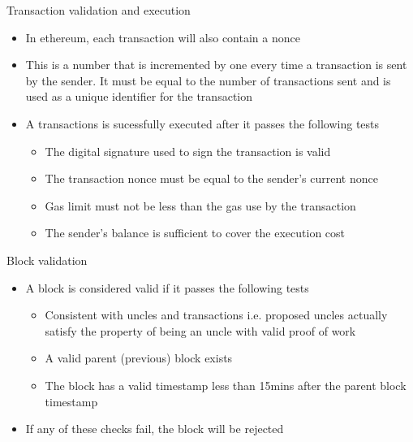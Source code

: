 \documentclass[10pt]{beamer}
\begin{document}

\begin{frame}{Transaction validation and execution}
	\begin{itemize}
		\item In ethereum, each transaction will also contain a nonce
		\item This is a number that is incremented by one every time a transaction is sent by the sender. It must be equal to the number of transactions sent and is used as a unique identifier for the transaction
		\item A transactions is sucessfully executed after it passes the following tests
		\begin{itemize}
			\item The digital signature used to sign the transaction is valid
			\item The transaction nonce must be equal to the sender's current nonce
			\item Gas limit must not be less than the gas use by the transaction
			\item The sender's balance is sufficient to cover the execution cost
		\end{itemize}
	\end{itemize}
\end{frame}


\begin{frame}{Block validation}
	\begin{itemize}
		\item A block is considered valid if it passes the following tests
		\begin{itemize}
			\item Consistent with uncles and transactions i.e. proposed uncles actually satisfy the property of being an uncle with valid proof of work
			\item A valid parent (previous) block exists
			\item The block has a valid timestamp less than 15mins after the parent block timestamp
		\end{itemize}
		\item If any of these checks fail, the block will be rejected
	\end{itemize}
\end{frame}

\end{document}
